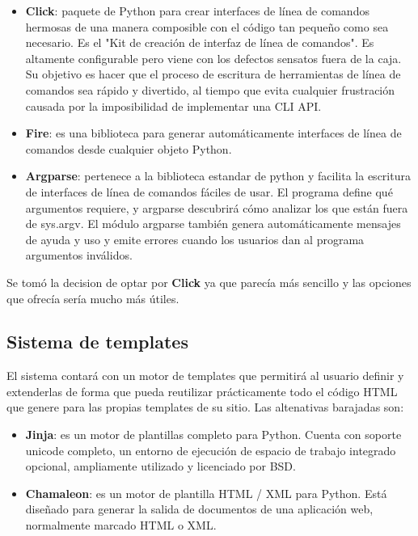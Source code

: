 \begin{itemize}
\item \textbf{Click}: paquete de Python para crear interfaces de línea de comandos hermosas de
una manera composible con el código tan pequeño como sea necesario. Es el "Kit de creación de interfaz de
línea de comandos". Es altamente configurable pero viene con los defectos sensatos fuera de la caja. Su objetivo es
hacer que el proceso de escritura de herramientas de línea de comandos sea rápido y divertido, al tiempo
que evita cualquier frustración causada por la imposibilidad de implementar una CLI API.
\item \textbf{Fire}: es una biblioteca para generar automáticamente interfaces de línea de comandos
desde cualquier objeto Python.
\item \textbf{Argparse}: pertenece a la biblioteca estandar de python y facilita la escritura de interfaces
de línea de comandos fáciles de usar. El programa define qué argumentos requiere, y argparse descubrirá cómo
analizar los que están fuera de sys.argv. El módulo argparse también genera automáticamente mensajes de ayuda
y uso y emite errores cuando los usuarios dan al programa argumentos inválidos.
\end{itemize}

Se tomó la decision de optar por \textbf{Click} ya que parecía más sencillo y las opciones que ofrecía sería mucho
más útiles.

\subsection{Sistema de templates}

El sistema contará con un motor de templates que permitirá al usuario definir y extenderlas de forma que pueda reutilizar
prácticamente todo el código HTML que genere para las propias templates de su sitio. Las altenativas barajadas son:


\begin{itemize}
\item \textbf{Jinja}: es un motor de plantillas completo para Python. Cuenta con soporte unicode completo,
un entorno de ejecución de espacio de trabajo integrado opcional, ampliamente utilizado y licenciado por BSD.
\item \textbf{Chamaleon}: es un motor de plantilla HTML / XML para Python. Está diseñado para generar
la salida de documentos de una aplicación web, normalmente marcado HTML o XML.
\end{itemize}

